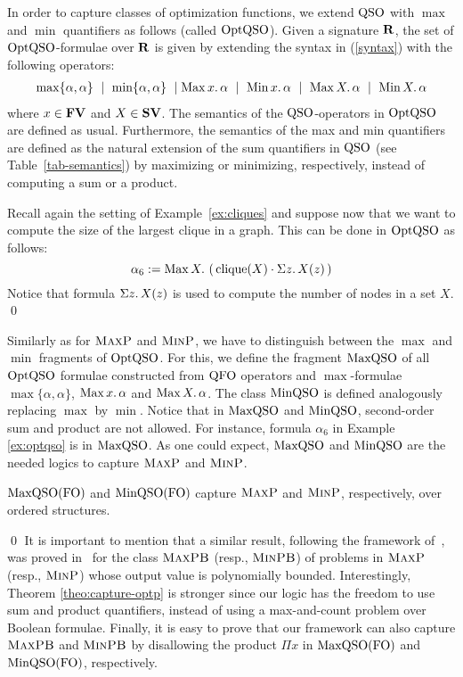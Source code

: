In order to capture classes of optimization functions, we extend ${\rm QSO}$ with $\max$ and $\min$ quantifiers as follows (called ${\rm OptQSO}$). 
Given a signature $\mathbf{R}$, the set of ${\rm OptQSO}$-formulae over $\mathbf{R}$ is given by extending the syntax in (\ref{syntax}) with the following operators:
\begin{align*}
\max\{\alpha,\alpha\} \ \mid\ \min\{\alpha,\alpha\} \ \mid \maxa{x} \alpha \ \mid \ \mina{x} \alpha \ \mid \ \maxa{X} \alpha \ \mid \ \mina{X} \alpha 
\end{align*}
where $x \in \mathbf{FV}$ and $X \in \mathbf{SV}$. The semantics of the ${\rm QSO}$-operators in ${\rm OptQSO}$ are defined as usual. Furthermore, the semantics of the max and min quantifiers are defined as the natural extension of the sum quantifiers in ${\rm QSO}$ (see Table~\ref{tab-semantics}) by maximizing or minimizing, respectively, instead of computing a sum or a product. 
\begin{exa}\label{ex:optqso}
	Recall again the setting of Example~\ref{ex:cliques} and suppose now that we want to compute the size of the largest clique in a graph. This can be done in ${\rm OptQSO}$ as follows:
	\[
\alpha_6 := \operatorname{Max}{X}.\, \left( \, \operatorname{clique}(X) \cdot \Sigma{z}.\, X(z)  \, \right)
	\]
	Notice that formula $\Sigma{z}.\, X(z)$ is used to compute the number of nodes in a set $X$.  \qed
\end{exa}
Similarly as for $\text{\sc MaxP}$ and $\text{\sc MinP}$, we have to distinguish between the $\max$ and $\min$ fragments of ${\rm OptQSO}$. For this, we define the fragment ${\rm MaxQSO}$ of all ${\rm OptQSO}$ formulae constructed from ${\rm QFO}$ operators and $\max$-formulae $\max\{\alpha,\alpha\}$, $\operatorname{Max}{x}.\, \alpha$ and  $\operatorname{Max}{X}.\, \alpha$.
The class ${\rm MinQSO}$ is defined analogously replacing $\max$ by $\min$. Notice that in ${\rm MaxQSO}$ and ${\rm MinQSO}$, second-order sum and product are not allowed. For instance, formula $\alpha_6$ in Example \ref{ex:optqso} is in ${\rm MaxQSO}$.
As one could expect, ${\rm MaxQSO}$ and ${\rm MinQSO}$ are the needed logics to capture $\text{\sc MaxP}$ and $\text{\sc MinP}$.
\begin{thm} \label{theo:capture-optp}
	${\rm MaxQSO}({\rm FO})$ and ${\rm MinQSO}({\rm FO})$ capture $\text{\sc MaxP}$ and $\text{\sc MinP}$, respectively, over ordered structures.
\end{thm}
\proof

\qed
It is important to mention that a similar result, following the framework of~\cite{SalujaST95}, was proved in~\cite{kolaitis1994logical} for the class $\text{\sc MaxPB}$ (resp., $\text{\sc MinPB}$) of problems in $\text{\sc MaxP}$ (resp., $\text{\sc MinP}$) whose output value is polynomially bounded.
Interestingly, Theorem \ref{theo:capture-optp} is stronger since our logic has the freedom to use sum and product quantifiers, instead of using a max-and-count problem over Boolean formulae. 
Finally, it is easy to prove that our framework can also capture $\text{\sc MaxPB}$ and $\text{\sc MinPB}$ by disallowing the product $\Pi x$ in ${\rm MaxQSO}({\rm FO})$ and ${\rm MinQSO}({\rm FO})$, respectively.

